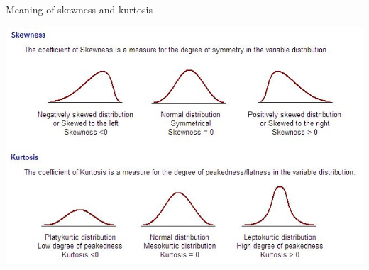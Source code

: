 \documentclass[smaller, hyperref={colorlinks=true}]{beamer}
\begin{document}
\begin{frame}{Meaning of skewness and kurtosis}
\begin{center}
\includegraphics[scale=0.6]{01_skewkurt.jpg} 
\end{center}
\end{frame}


%
\end{document}
